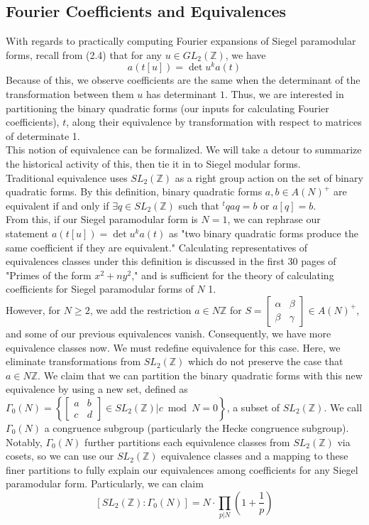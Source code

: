 \documentclass[11pt, oneside]{amsart}
\begin{document}
\subsection{Fourier Coefficients and Equivalences}
With regards to practically computing Fourier expansions of Siegel paramodular forms, recall from (2.4) that for any $u\in GL_{2}(\mathbb{Z})$, we have $$a(t[u])=\operatorname{det} u^{k} a(t)$$
Because of this, we observe coefficients are the same when the determinant of the transformation between them $u$ has determinant $1$. Thus, we are interested in partitioning the binary quadratic forms (our inputs for calculating Fourier coefficients), $t$, along their equivalence by transformation with respect to matrices of determinate 1.\\
This notion of equivalence can be formalized. We will take a detour to summarize the historical activity of this, then tie it in to Siegel modular forms.\\
Traditional equivalence uses $SL_{2}(\mathbb{Z})$ as a right group action on the set of binary quadratic forms. By this definition, binary quadratic forms $a,b\in A(N)^{+}$ are equivalent if and only if  $\exists q\in SL_{2}(\mathbb{Z})$ such that $^{t}qaq=b$ or $a[q]=b$.\\
From this, if our Siegel paramodular form is $N=1$, we can rephrase our statement $a(t[u])=\operatorname{det} u^{k} a(t)$ as "two binary quadratic forms produce the same coefficient if they are equivalent." Calculating representatives of equivalences classes under this definition is discussed in the first 30 pages of "Primes of the form $x^2+ny^2$," and is sufficient for the theory of calculating coefficients for Siegel paramodular forms of $N$ 1.\\
However, for $N \geq 2$, we add the restriction $a\in N\mathbb{Z}$ for $S=\left[ \begin{matrix}\alpha & \beta \\ \beta & \gamma \end{matrix}\right]\in A(N)^{+}$, and some of our previous equivalences vanish. Consequently, we have more equivalence classes now. We must redefine equivalence for this case. Here, we eliminate transformations from $SL_{2}(\mathbb{Z})$ which do not preserve the case that $a\in N\mathbb{Z}$. We claim that we can partition the binary quadratic forms with this new equivalence by using a new set, defined as $\Gamma_{0}(N) = \left \{\left[ \begin{matrix}a & b \\ c & d \end{matrix}\right]\in SL_{2}(\mathbb{Z})\vert c\bmod N = 0\right \}$, a subset of $SL_{2}(\mathbb{Z})$. We call $\Gamma_{0}(N)$ a congruence subgroup (particularly the Hecke congruence subgroup). Notably, $\Gamma_{0}(N)$  further partitions each equivalence classes from $SL_{2}(\mathbb{Z})$ via cosets, so we can use our $SL_{2}(\mathbb{Z})$ equivalence classes and a mapping to these finer partitions to fully explain our equivalences among coefficients for any Siegel paramodular form. Particularly, we can claim $$\left[SL_{2}(\mathbb{Z}) : \Gamma_{0}(N)\right]=N \cdot \prod_{p | N}\left(1+\frac{1}{p}\right)$$ \\
\end{document}
